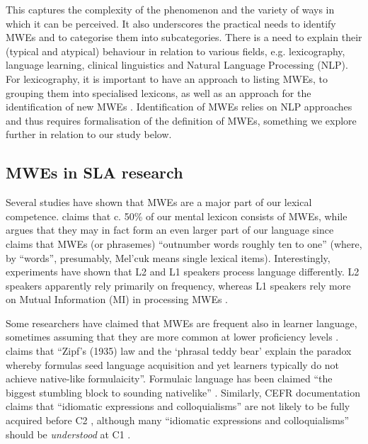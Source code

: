 \documentclass[output=paper,colorlinks,citecolor=brown]{langscibook}
\begin{document}
This captures the complexity of the phenomenon 
and the variety of ways in which it can be perceived. 
 It also underscores the practical needs to identify MWEs and to categorise them into subcategories. There is a need to explain their (typical and atypical) behaviour in relation to various fields, e.g. lexicography, language learning, clinical linguistics and Natural Language Processing (NLP). For lexicography, it is important to have an approach to listing MWEs, to grouping them into specialised lexicons, as well as an approach for the identification of new MWEs \citep[][]{agirre2006lexicalization}. Identification of MWEs relies on NLP  approaches \citep[][]{baldwin2002multiword,Sag:Baldwin:2002,piao2005comparing,attia2010automatic,de2010alignment,watrin2011n,shigeto2013construction} and thus requires formalisation of the definition of MWEs, something we explore further in relation to our study below.

\subsection{MWEs in SLA research}\label{sec:MWESLA}
Several studies have shown that MWEs are a major part of our lexical competence. 
\citet{jackendoff1997architecture} claims that c. 50\% of our mental lexicon consists of MWEs, while 
\citet[28]{erman2007cognitive}  argues that  
they may in fact form an even larger part of our language since \citet[][24]{mel1998collocations} claims that MWEs (or phrasemes) “outnumber words roughly ten to one” (where, by “words”, presumably, Mel’cuk means single lexical items). Interestingly, experiments have shown that L2 and L1 speakers process language differently. L2 speakers apparently rely primarily on frequency, whereas L1 speakers rely more on Mutual Information (MI) in processing MWEs \citep[][24]{ellis2012formulaic}. 

 
Some researchers have claimed that MWEs are frequent also in learner language, sometimes assuming that they are more common at lower proficiency levels \citep[][173 citing the work of others]{wray2002formulaic}. \citet[][18]{ellis2012formulaic} claims that ``Zipf’s (1935) law and the ‘phrasal teddy bear’ explain the paradox whereby formulas seed language acquisition and yet learners typically do not achieve native-like formulaicity''. Formulaic language has been claimed ``the biggest stumbling block to sounding nativelike'' \citep[][ix]{wray2002formulaic}. Similarly, CEFR documentation claims that ``idiomatic expressions and colloquialisms'' are not likely to be fully acquired before C2 \citep[][185, 187]{coe2009relating}, although many ``idiomatic expressions and colloquialisms'' should be \textit{understood} at C1 \citep[][124, 143]{coe2009relating}.
\end{document}
